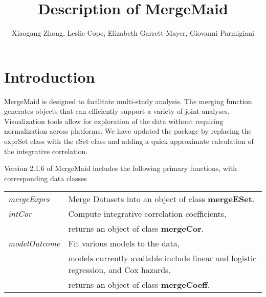 \documentclass[12pt]{article}
\author{Xiaogang Zhong, Leslie Cope, Elizabeth Garrett-Mayer, Giovanni Parmigiani}
\begin{document}
\title{Description of MergeMaid}

\maketitle

\section{Introduction}

MergeMaid is designed to facilitate multi-study analysis.  The
merging function generates objects that can efficiently support a
variety of joint analyses.  Visualization tools allow for
exploration of the data without requiring normalization across
platforms. We have updated the package by replacing the exprSet
class with the eSet class and adding a quick approximate calculation
of the integrative correlation.

Version 2.1.6 of MergeMaid includes the following primary functions,
with corresponding data classes

\begin{center}
  \begin{tabular}{|lp{5in}|}
    \hline
    {\it mergeExprs} & Merge Datasets into an object of class {\bf mergeESet}.\\
    {\it intCor} & Compute integrative correlation coefficients,\\
& returns an object of class {\bf mergeCor}.\\
    {\it modelOutcome} & Fit various models to the data, \\
    & models currently available include linear and logistic regression, and Cox hazards,\\
& returns an object of class {\bf mergeCoeff}.
  \end{tabular}
\end{center}
\end{document}
